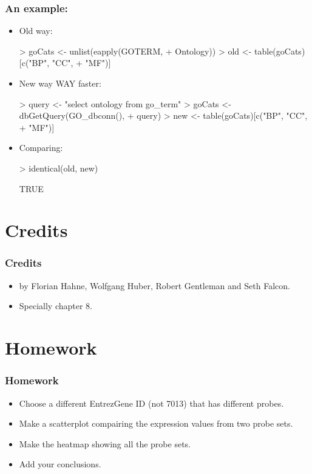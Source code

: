 \begin{frame}
  \frametitle{An example:}
  \begin{itemize}
  \item Old way:
\begin{Schunk}
\begin{Sinput}
> goCats <- unlist(eapply(GOTERM, 
+     Ontology))
> old <- table(goCats)[c("BP", "CC", 
+     "MF")]
\end{Sinput}
\end{Schunk}
  \item New way \alert{WAY faster}:  
\begin{Schunk}
\begin{Sinput}
> query <- "select ontology from go_term"
> goCats <- dbGetQuery(GO_dbconn(), 
+     query)
> new <- table(goCats)[c("BP", "CC", 
+     "MF")]
\end{Sinput}
\end{Schunk}
  \item Comparing:
\begin{Schunk}
\begin{Sinput}
> identical(old, new)
\end{Sinput}
\begin{Soutput}
[1] TRUE
\end{Soutput}
\end{Schunk}
  \end{itemize}
\end{frame}

\section{Credits}

\begin{frame}[allowframebreaks]
  \frametitle{Credits}
  \begin{itemize}
  \item {} by Florian Hahne, Wolfgang Huber, Robert Gentleman and Seth Falcon.
  \item Specially chapter 8.
  \end{itemize}
\end{frame}

\section{Homework}
\begin{frame}[allowframebreaks]
  \frametitle{Homework}
  \begin{itemize}
  \item Choose a different EntrezGene ID (not 7013) that has different probes.
  \item Make a scatterplot compairing the expression values from two probe sets.
  \item Make the heatmap showing all the probe sets.
  \item Add your conclusions.
  \end{itemize}
\end{frame}

